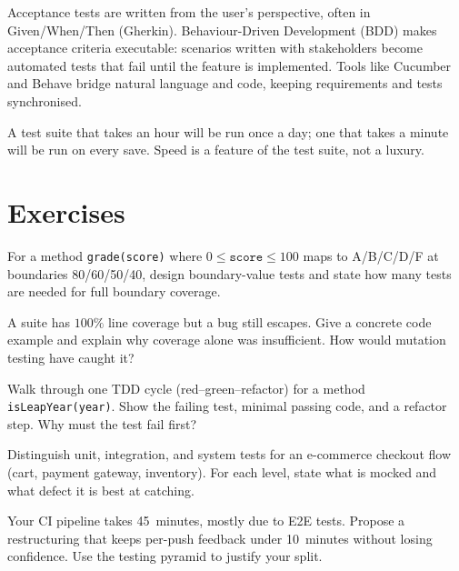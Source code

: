Acceptance tests are written from the user's perspective, often in Given/When/Then (Gherkin). Behaviour-Driven Development (BDD) makes acceptance criteria executable: scenarios written with stakeholders become automated tests that fail until the feature is implemented. Tools like Cucumber and Behave bridge natural language and code, keeping requirements and tests synchronised.

\begin{remark}
A test suite that takes an hour will be run once a day; one that takes a minute will be run on every save. Speed is a feature of the test suite, not a luxury.
\end{remark}

\section{Exercises}

\begin{exercise}
For a method \texttt{grade(score)} where $0 \leq \texttt{score} \leq 100$ maps to A/B/C/D/F at boundaries 80/60/50/40, design boundary-value tests and state how many tests are needed for full boundary coverage.
\end{exercise}

\begin{exercise}
A suite has $100\%$ line coverage but a bug still escapes. Give a concrete code example and explain why coverage alone was insufficient. How would mutation testing have caught it?
\end{exercise}

\begin{exercise}
Walk through one TDD cycle (red--green--refactor) for a method \texttt{isLeapYear(year)}. Show the failing test, minimal passing code, and a refactor step. Why must the test fail first?
\end{exercise}

\begin{exercise}
Distinguish unit, integration, and system tests for an e-commerce checkout flow (cart, payment gateway, inventory). For each level, state what is mocked and what defect it is best at catching.
\end{exercise}

\begin{exercise}
Your CI pipeline takes 45~minutes, mostly due to E2E tests. Propose a restructuring that keeps per-push feedback under 10~minutes without losing confidence. Use the testing pyramid to justify your split.
\end{exercise}
